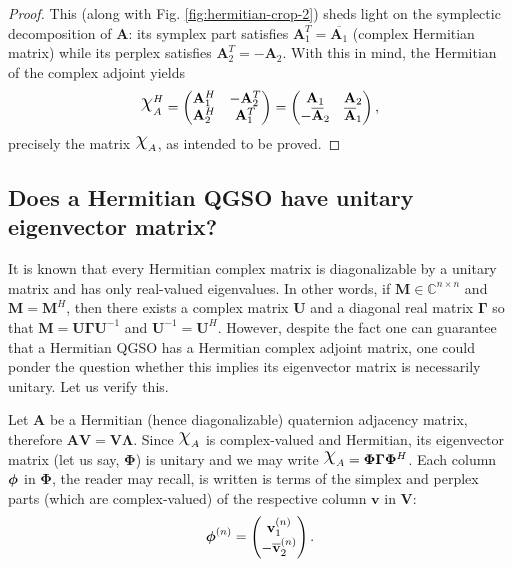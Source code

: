 \begin{proof}
    This (along with Fig. \ref{fig:hermitian-crop-2}) sheds light on the symplectic decomposition of $\mathbf{A}$: its symplex part satisfies $\mathbf{A}^T_1 = \overline{\mathbf{A}_1}$ (complex Hermitian matrix) while its perplex satisfies $\mathbf{A}^T_2 = - \mathbf{A}_2$.
    With this in mind, the Hermitian of the complex adjoint yields
    \begin{equation}
        \rchi_A^H =
        \begin{pmatrix}
            \mathbf{A}^H_1 & - \mathbf{A}^T_2 \\
            \mathbf{A}^H_2 & \mathbf{A}^T_1
        \end{pmatrix}
        =
        \begin{pmatrix}
            \mathbf{A}_1             & \mathbf{A}_2            \\
            -\overline{\mathbf{A}}_2 & \overline{\mathbf{A}}_1
        \end{pmatrix},
    \end{equation}
    precisely the matrix $\rchi_A$, as intended to be proved.
\end{proof}

\subsection{Does a Hermitian QGSO have unitary eigenvector matrix?}

It is known that every Hermitian complex matrix is diagonalizable by a unitary matrix and has only real-valued eigenvalues. In other words, if $\mathbf{M} \in \mathbb{C}^{n \times n}$ and $\mathbf{M} = \mathbf{M}^H$, then there exists a complex matrix $\mathbf{U}$ and a diagonal real matrix $\mathbf{\Gamma}$ so that $\mathbf{M} = \mathbf{U} \mathbf{\Gamma} \mathbf{U}^{-1}$ and $\mathbf{U}^{-1} = \mathbf{U}^H$. However, despite the fact one can guarantee that a Hermitian QGSO has a Hermitian complex adjoint matrix, one could ponder the question whether this implies its eigenvector matrix is necessarily unitary. Let us verify this.

Let $\mathbf{A}$ be a Hermitian (hence diagonalizable) quaternion adjacency matrix, therefore $\mathbf{A} \mathbf{V} = \mathbf{V} \mathbf{\Lambda}$. Since $\rchi_{A}$ is complex-valued and Hermitian, its eigenvector matrix (let us say, $\mathbf{\Phi}$) is unitary and we may write $\rchi_{A} = \mathbf{\Phi} \mathbf{\Gamma} \mathbf{\Phi}^H$. Each column $\boldsymbol{\phi}$ in $\mathbf{\Phi}$, the reader may recall, is written is terms of the simplex and perplex parts (which are complex-valued) of the respective column $\mathbf{v}$ in $\mathbf{V}$:
\begin{equation}
    \mathbf{\boldsymbol{\phi}}^{(n)} =
    \begin{pmatrix}
        \mathbf{v}^{(n)}_1 \\
        - \overline{\mathbf{v}}^{(n)}_2
    \end{pmatrix}.
\end{equation}

